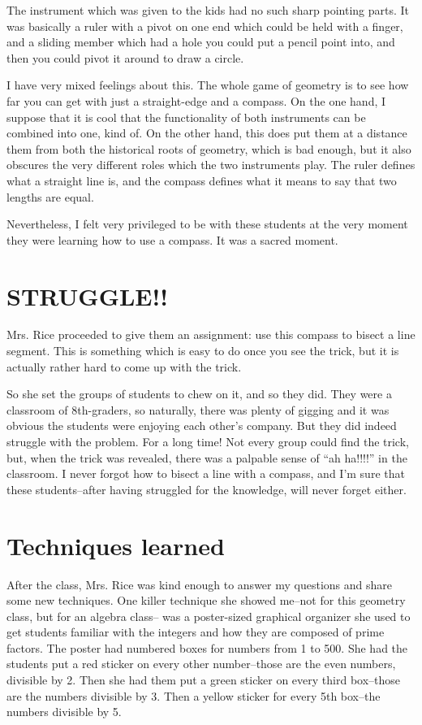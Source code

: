 \documentclass[11pt]{elegantbook}
\begin{document}
The instrument which was given to the kids had no such sharp pointing
parts.  It was basically a ruler with a pivot on one end which could
be held with a finger, and a sliding member which had a hole you could
put a pencil point into, and then you could pivot it around to draw a
circle.

I have very mixed feelings about this.  The whole game of geometry is
to see how far you can get with just a straight-edge and a compass.
On the one hand, I suppose that it is cool that the functionality of
both instruments can be combined into one, kind of.  On the other
hand, this does put them at a distance them from both the historical
roots of geometry, which is bad enough, but it also obscures the very
different roles which the two instruments play.  The ruler defines
what a straight line is, and the compass defines what it means to say
that two lengths are equal.

Nevertheless, I felt very privileged to be with these students at the
very moment they were learning how to use a compass.  It was a sacred
moment.

\section*{STRUGGLE!!}

Mrs. Rice proceeded to give them an assignment: use this compass to
bisect a line segment.  This is something which is easy to do once you
see the trick, but it is actually rather hard to come up with the
trick.

So she set the groups of students to chew on it, and so they did.
They were a classroom of 8th-graders, so naturally, there was plenty
of gigging and it was obvious the students were enjoying each other's
company.  But they did indeed struggle with the problem.  For a long
time!  Not every group could find the trick, but, when the trick was
revealed, there was a palpable sense of ``ah ha!!!!'' in the
classroom.  I never forgot how to bisect a line with a compass, and
I'm sure that these students--after having struggled for the
knowledge, will never forget either.

\section*{Techniques learned}

After the class, Mrs. Rice was kind enough to answer my questions and
share some new techniques.  One killer technique she showed me--not
for this geometry class, but for an algebra class-- was a poster-sized
graphical organizer she used to get students familiar with the
integers and how they are composed of prime factors.  The poster had
numbered boxes for numbers from 1 to 500.  She had the students put a
red sticker on every other number--those are the even numbers,
divisible by 2.  Then she had them put a green sticker on every third
box--those are the numbers divisible by 3.  Then a yellow sticker for
every 5th box--the numbers divisible by 5.
\end{document}
